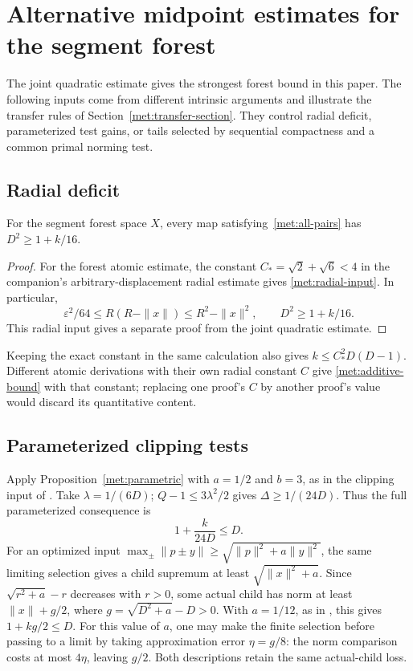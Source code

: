 \section{Alternative midpoint estimates for the segment forest}
\label{met:forest-variants}
The joint quadratic estimate gives the strongest forest bound in this
paper. The following inputs come from different intrinsic arguments and
illustrate the transfer rules of Section~\ref{met:transfer-section}.
They control radial deficit, parameterized test gains, or tails selected
by sequential compactness and a common primal norming test.

\subsection{Radial deficit}
\begin{corollary}\label{met:atomic-distortion}
For the segment forest space $X$, every map satisfying~\eqref{met:all-pairs}
has $D^2\ge1+k/16$.
\end{corollary}
\begin{proof}
For the forest atomic estimate, the constant
$C_*=\sqrt2+\sqrt6<4$ in the companion's arbitrary-displacement radial estimate
\cite[Proposition~12.1]{SegmentLenses} gives
\eqref{met:radial-input}. In particular,
\[
 \varepsilon^2/64\le R(R-\|x\|)\le R^2-\|x\|^2,
 \qquad D^2\ge1+k/16.
\]
This radial input gives a separate proof from the joint quadratic estimate.
\end{proof}
Keeping the
exact constant in the same calculation also gives
$k\le C_*^2D(D-1)$. Different atomic derivations with their own radial
constant $C$ give \eqref{met:additive-bound} with that constant; replacing
one proof's $C$ by another proof's value would discard its quantitative
content.

\subsection{Parameterized clipping tests}
Apply Proposition~\ref{met:parametric} with $a=1/2$ and $b=3$, as in the clipping input of
\cite[Section~10.1, Equation~(10.9)]{SegmentLenses}. Take $\lambda=1/(6D)$;
$Q-1\le3\lambda^2/2$ gives $\Delta\ge1/(24D)$.
Thus the full parameterized consequence is
\begin{equation}\label{met:parametric-twentyfour}
 1+\frac{k}{24D}\le D.
\end{equation}
For an optimized input
$\max_\pm\|p\pm y\|\ge\sqrt{\|p\|^2+a\|y\|^2}$,
the same limiting selection gives a child supremum at least
$\sqrt{\|x\|^2+a}$. Since
$\sqrt{r^2+a}-r$ decreases with $r>0$, some actual child has norm
at least $\|x\|+g/2$, where $g=\sqrt{D^2+a}-D>0$.
With $a=1/12$, as in
\cite[Proposition~10.4 and Equation~(10.10)]{SegmentLenses}, this gives
$1+kg/2\le D$. For this value of $a$, one
may make the finite selection before passing to a limit by taking approximation error
$\eta=g/8$: the norm comparison costs at most $4\eta$, leaving
$g/2$. Both descriptions retain the same actual-child loss.

